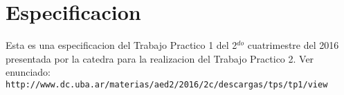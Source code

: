 \documentclass[10pt, a4paper]{article}
\begin{document}
{} %


\maketitle

\tableofcontents

\pagebreak


\section{Especificacion}
Esta es una especificacion del Trabajo Practico 1 del 2$^{do}$ cuatrimestre del 2016 presentada por la catedra para la realizacion del Trabajo Practico 2. Ver enunciado:\\
\verb+http://www.dc.uba.ar/materias/aed2/2016/2c/descargas/tps/tp1/view+\\


\newpage

\newpage

\newpage

\newpage

\end{document}

